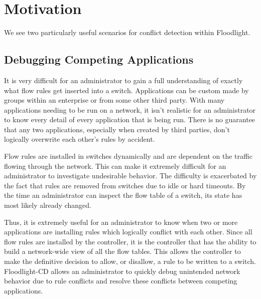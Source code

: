 \section{Motivation}
\label{sec:motivation}

We see two particularly useful scenarios for conflict detection within Floodlight.

\subsection{Debugging Competing Applications}
It is very difficult for an administrator to gain a full understanding of exactly what flow rules get inserted into a switch. 
Applications can be custom made by groups within an enterprise or from some other third party.
With many applications needing to be run on a network, it isn't realistic for an administrator to know every detail of every application that is being run.
There is no guarantee that any two applications, especially when created by third parties, don't logically overwrite each other's rules by accident.

Flow rules are installed in switches dynamically and are dependent on the traffic flowing through the network.
This can make it extremely difficult for an administrator to investigate undesirable behavior.
The difficulty is exacerbated by the fact that rules are removed from switches due to idle or hard timeouts.
By the time an administrator can inspect the flow table of a switch, its state has most likely already changed.

Thus, it is extremely useful for an administrator to know when two or more applications are installing rules which logically conflict with each other.
Since all flow rules are installed by the controller, it is the controller that has the ability to build a network-wide view of all the flow tables.
This allows the controller to make the definitive decision to allow, or disallow, a rule to be written to a switch.
Floodlight-CD allows an administrator to quickly debug unintended network behavior due to rule conflicts and resolve these conflicts between competing applications.

